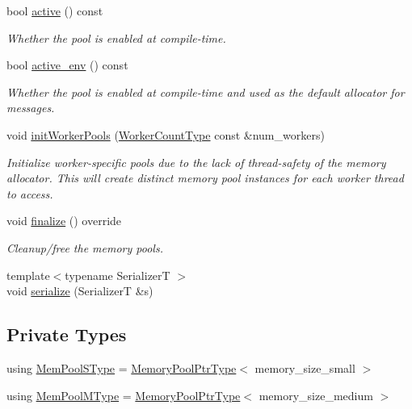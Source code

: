 \begin{DoxyCompactItemize}
bool \hyperlink{structvt_1_1pool_1_1_pool_a3f34112821d767815d5049dc83503033}{active} () const
\begin{DoxyCompactList}\small\item\em Whether the pool is enabled at compile-\/time. \end{DoxyCompactList}\item 
bool \hyperlink{structvt_1_1pool_1_1_pool_aa11bdd76d9f6491ac412d5abc5c63274}{active\+\_\+env} () const
\begin{DoxyCompactList}\small\item\em Whether the pool is enabled at compile-\/time and used as the default allocator for messages. \end{DoxyCompactList}\item 
void \hyperlink{structvt_1_1pool_1_1_pool_aeb8ad6a3ac3cf168dc4f2d2be2714edc}{init\+Worker\+Pools} (\hyperlink{namespacevt_aa93398ea48f2cb6c188512250f7cc248}{Worker\+Count\+Type} const \&num\+\_\+workers)
\begin{DoxyCompactList}\small\item\em Initialize worker-\/specific pools due to the lack of thread-\/safety of the memory allocator. This will create distinct memory pool instances for each worker thread to access. \end{DoxyCompactList}\item 
void \hyperlink{structvt_1_1pool_1_1_pool_a45a2880809625a77bb93c3dfcd9c7603}{finalize} () override
\begin{DoxyCompactList}\small\item\em Cleanup/free the memory pools. \end{DoxyCompactList}\item 
{\footnotesize template$<$typename SerializerT $>$ }\\void \hyperlink{structvt_1_1pool_1_1_pool_a7a81f11ae46f0c953c600b223bc09c70}{serialize} (SerializerT \&s)
\end{DoxyCompactItemize}
\subsection*{Private Types}
\begin{DoxyCompactItemize}
\item 
using \hyperlink{structvt_1_1pool_1_1_pool_a9f94985824d12c43357cfe50eaaefd38}{Mem\+Pool\+S\+Type} = \hyperlink{structvt_1_1pool_1_1_pool_a21e20f5b56c3bae4f0d0cc36ed9c5eee}{Memory\+Pool\+Ptr\+Type}$<$ memory\+\_\+size\+\_\+small $>$
\item 
using \hyperlink{structvt_1_1pool_1_1_pool_a8a201b9a843e47cd4e7b568a8e4483da}{Mem\+Pool\+M\+Type} = \hyperlink{structvt_1_1pool_1_1_pool_a21e20f5b56c3bae4f0d0cc36ed9c5eee}{Memory\+Pool\+Ptr\+Type}$<$ memory\+\_\+size\+\_\+medium $>$
\end{DoxyCompactItemize}
